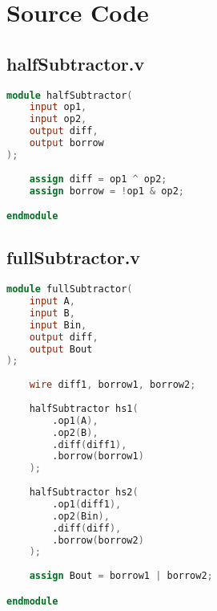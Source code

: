 \documentclass[a4paper,12pt]{article}
\begin{document}
\newpage

\section*{Source Code}
\subsection*{halfSubtractor.v}
\begin{lstlisting}[language=Verilog]
module halfSubtractor(
    input op1,
    input op2,
    output diff,
    output borrow
);
    
    assign diff = op1 ^ op2;
    assign borrow = !op1 & op2;

endmodule
\end{lstlisting}

\newpage

\subsection*{fullSubtractor.v}
\begin{lstlisting}[language=Verilog]
module fullSubtractor(
    input A,
    input B,
    input Bin,
    output diff,
    output Bout
);
    
    wire diff1, borrow1, borrow2;
    
    halfSubtractor hs1(
        .op1(A),
        .op2(B),
        .diff(diff1),
        .borrow(borrow1)
    );
    
    halfSubtractor hs2(
        .op1(diff1),
        .op2(Bin),
        .diff(diff),
        .borrow(borrow2)
    );
    
    assign Bout = borrow1 | borrow2;

endmodule
\end{lstlisting}

\newpage
\end{document}
